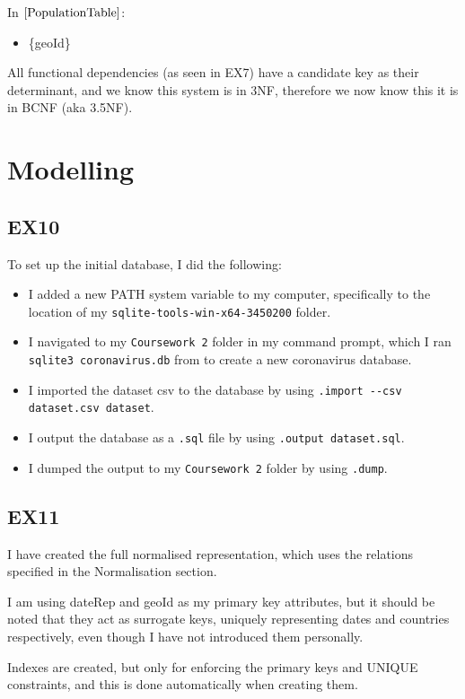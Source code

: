 \documentclass{article}
\begin{document}
In $\ref{PopulationTable}$:
\begin{itemize}
\item \{geoId\}
\end{itemize}

All functional dependencies (as seen in EX7) have a candidate key as their determinant, and we know this system is in 3NF, therefore we now know this it is in BCNF (aka 3.5NF).

\section{Modelling}

\subsection{EX10}

To set up the initial database, I did the following:
\begin{itemize}
\item I added a new PATH system variable to my computer, specifically to the location of my \verb|sqlite-tools-win-x64-3450200| folder.
\item I navigated to my \verb|Coursework 2| folder in my command prompt, which I ran \verb|sqlite3 coronavirus.db| from to create a new coronavirus database.
\item I imported the dataset csv to the database by using \verb|.import --csv dataset.csv dataset|.
\item I output the database as a \verb|.sql| file by using \verb|.output dataset.sql|.
\item I dumped the output to my \verb|Coursework 2| folder by using \verb|.dump|.
\end{itemize}

\subsection{EX11}

I have created the full normalised representation, which uses the relations specified in the Normalisation section.

I am using dateRep and geoId as my primary key attributes, but it should be noted that they act as surrogate keys, uniquely representing dates and countries respectively, even though I have not introduced them personally.

Indexes are created, but only for enforcing the primary keys and UNIQUE constraints, and this is done automatically when creating them.
\end{document}
